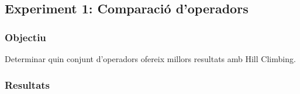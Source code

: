 \subsection{Experiment 1: Comparació d'operadors}

\subsubsection{Objectiu}
Determinar quin conjunt d'operadors ofereix millors resultats amb Hill Climbing.

\subsubsection{Resultats}





